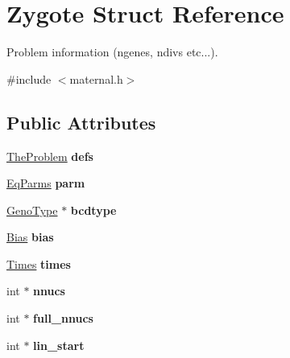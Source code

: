 \hypertarget{structZygote}{
\section{Zygote Struct Reference}
\label{structZygote}
}


Problem information (ngenes, ndivs etc...).  


{\ttfamily \#include $<$maternal.h$>$}\subsection*{Public Attributes}
\begin{DoxyCompactItemize}
\item 
\hypertarget{structZygote_a379cf9da097a00aae411511c94937777}{
\hyperlink{structTheProblem}{TheProblem} {\bfseries defs}}
\label{structZygote_a379cf9da097a00aae411511c94937777}

\item 
\hypertarget{structZygote_a633d07c99983d332705c93bad793a63a}{
\hyperlink{structEqParms}{EqParms} {\bfseries parm}}
\label{structZygote_a633d07c99983d332705c93bad793a63a}

\item 
\hypertarget{structZygote_a67470d33adf95afff56f33f672212247}{
\hyperlink{structGenoType}{GenoType} $\ast$ {\bfseries bcdtype}}
\label{structZygote_a67470d33adf95afff56f33f672212247}

\item 
\hypertarget{structZygote_a3af8cf89d6509cc585b70d50a4f82729}{
\hyperlink{structBias}{Bias} {\bfseries bias}}
\label{structZygote_a3af8cf89d6509cc585b70d50a4f82729}

\item 
\hypertarget{structZygote_afc7d588a952c9805b93c973ff25ff898}{
\hyperlink{structTimes}{Times} {\bfseries times}}
\label{structZygote_afc7d588a952c9805b93c973ff25ff898}

\item 
\hypertarget{structZygote_a892a5b8e039511526bcb9abd1b3cd2cb}{
int $\ast$ {\bfseries nnucs}}
\label{structZygote_a892a5b8e039511526bcb9abd1b3cd2cb}

\item 
\hypertarget{structZygote_a8e9ca403391357f16b718962126b1793}{
int $\ast$ {\bfseries full\_\-nnucs}}
\label{structZygote_a8e9ca403391357f16b718962126b1793}

\item 
\hypertarget{structZygote_af6416bb77bf87e9866858628aecd70d0}{
int $\ast$ {\bfseries lin\_\-start}}
\label{structZygote_af6416bb77bf87e9866858628aecd70d0}


\end{DoxyCompactItemize}
